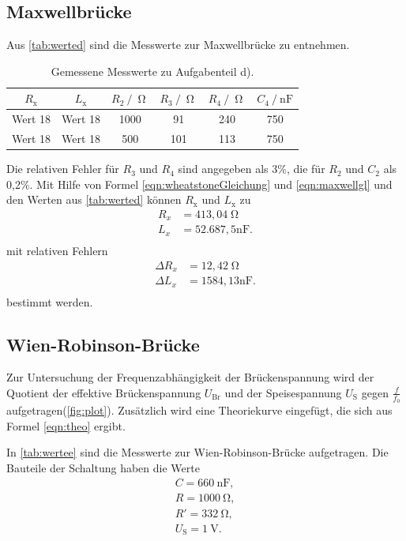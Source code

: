 \subsection{Maxwellbrücke}
Aus \autoref{tab:werted} sind die Messwerte zur Maxwellbrücke zu entnehmen.
\begin{table}[H]
  \centering
  \caption{Gemessene Messwerte zu Aufgabenteil d).}
  \label{tab:werted}
  \begin{tabular}{c c c c c c}
    \toprule
    $R_{\text{x}}$ & $L_{\text{x}}$ & $R_{\text{2}} \:/\: \upOmega$ & $R_{\text{3}} \:/\: \upOmega$ & $R_{\text{4}} \:/\: \upOmega$  & $C_{\text{4}} \:/\: \si{\nano\farad}$ \\
    \midrule
    Wert 18 & Wert 18 & 1000 & 91 & 240 & 750 \\
    Wert 18 & Wert 18 & 500 & 101 & 113 & 750 \\
    \bottomrule
  \end{tabular}
\end{table}
Die relativen Fehler für $R_3$ und $R_4$ sind angegeben als 3\%, die für $R_2$ und $C_2$ als 0,2\%. Mit Hilfe von Formel \autoref{eqn:wheatstoneGleichung} und
\autoref{eqn:maxwellgl} und den Werten aus \autoref{tab:werted} können $R_{\text{x}}$ und $L_{\text{x}}$ zu
\begin{align*}
  R_x &= 413,04 \upOmega \\
  L_x &= 52.687,5 \si{\nano\farad} . \\
\end{align*}
mit relativen Fehlern
\begin{align*}
  \Delta R_x &= 12,42 \upOmega \\
  \Delta L_x &= 1584,13 \si{\nano\farad} . \\
\end{align*}
bestimmt werden.


\subsection{Wien-Robinson-Brücke}
Zur Untersuchung der Frequenzabhängigkeit der Brückenspannung wird der Quotient der effektive Brückenspannung $U_{\text{Br}}$ und der Speisespannung $U_{\text{S}}$
gegen $\frac{f}{f_0}$ aufgetragen(\autoref{fig:plot}). Zusätzlich wird eine Theoriekurve eingefügt, die sich aus Formel \autoref{eqn:theo} ergibt.

In \autoref{tab:wertee} sind die Messwerte zur Wien-Robinson-Brücke aufgetragen. Die Bauteile der Schaltung haben die Werte
\begin{align*}
  C = \SI{660}{\nano\farad},\\
  R = \SI{1000}{\ohm}, \\
  R' = \SI{332}{\ohm}, \\
  U_{\text{S}} = \SI{1}{\volt}. \\
\end{align*}


